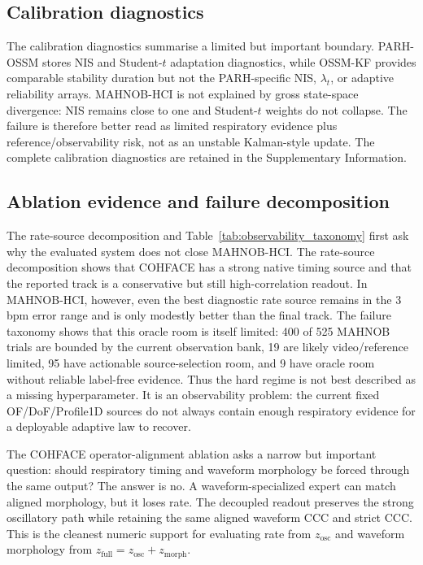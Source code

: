 \documentclass[fleqn,10pt]{wlscirep}
\begin{document}
\subsection*{Calibration diagnostics}
The calibration diagnostics summarise a limited but important boundary.
PARH-OSSM stores NIS and Student-$t$ adaptation diagnostics, while
OSSM-KF provides comparable stability duration but not the
PARH-specific NIS, $\lambda_t$, or adaptive reliability arrays. MAHNOB-HCI is not
explained by gross state-space divergence: NIS remains close to one and
Student-$t$ weights do not collapse. The failure is therefore better read as
limited respiratory evidence plus reference/observability risk, not as an
unstable Kalman-style update. The complete calibration diagnostics are retained
in the Supplementary Information.

\subsection*{Ablation evidence and failure decomposition}
The rate-source decomposition and
Table~\ref{tab:observability_taxonomy} first ask why the evaluated system does
not close MAHNOB-HCI. The rate-source decomposition shows that COHFACE has a strong native
timing source and that the reported track is a conservative but still
high-correlation readout. In MAHNOB-HCI, however, even the best diagnostic rate
source remains in the 3 bpm error range and is only modestly better than the
final track. The failure taxonomy shows that this oracle room is itself
limited: 400 of 525 MAHNOB trials are bounded by the current observation bank,
19 are likely video/reference limited, 95 have actionable source-selection
room, and 9 have oracle room without reliable label-free evidence. Thus
the hard regime is not best described as a missing hyperparameter. It is an
observability problem: the current fixed OF/DoF/Profile1D sources do not always
contain enough respiratory evidence for a deployable adaptive law to recover.

The COHFACE operator-alignment ablation asks a narrow but important question:
should respiratory timing and waveform morphology be forced through the same
output? The answer is no. A waveform-specialized expert can match aligned
morphology, but it loses rate. The decoupled readout preserves the strong
oscillatory path while retaining the same aligned waveform CCC and strict CCC.
This is the cleanest numeric support for evaluating rate from $z_{\mathrm{osc}}$
and waveform morphology from
$z_{\mathrm{full}}=z_{\mathrm{osc}}+z_{\mathrm{morph}}$.
\end{document}
